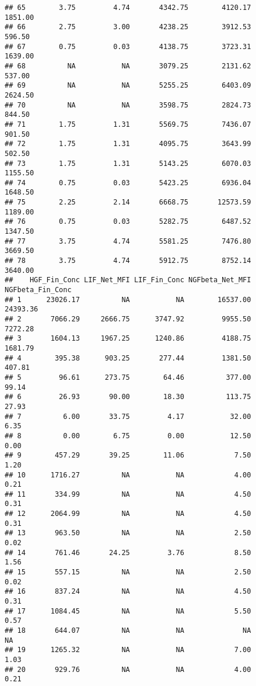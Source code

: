 \documentclass[]{article}
\begin{document}
\begin{verbatim}
## 65        3.75         4.74       4342.75        4120.17     1851.00
## 66        2.75         3.00       4238.25        3912.53      596.50
## 67        0.75         0.03       4138.75        3723.31     1639.00
## 68          NA           NA       3079.25        2131.62      537.00
## 69          NA           NA       5255.25        6403.09     2624.50
## 70          NA           NA       3598.75        2824.73      844.50
## 71        1.75         1.31       5569.75        7436.07      901.50
## 72        1.75         1.31       4095.75        3643.99      502.50
## 73        1.75         1.31       5143.25        6070.03     1155.50
## 74        0.75         0.03       5423.25        6936.04     1648.50
## 75        2.25         2.14       6668.75       12573.59     1189.00
## 76        0.75         0.03       5282.75        6487.52     1347.50
## 77        3.75         4.74       5581.25        7476.80     3669.50
## 78        3.75         4.74       5912.75        8752.14     3640.00
##    HGF_Fin_Conc LIF_Net_MFI LIF_Fin_Conc NGFbeta_Net_MFI NGFbeta_Fin_Conc
## 1      23026.17          NA           NA        16537.00         24393.36
## 2       7066.29     2666.75      3747.92         9955.50          7272.28
## 3       1604.13     1967.25      1240.86         4188.75          1681.79
## 4        395.38      903.25       277.44         1381.50           407.81
## 5         96.61      273.75        64.46          377.00            99.14
## 6         26.93       90.00        18.30          113.75            27.93
## 7          6.00       33.75         4.17           32.00             6.35
## 8          0.00        6.75         0.00           12.50             0.00
## 9        457.29       39.25        11.06            7.50             1.20
## 10      1716.27          NA           NA            4.00             0.21
## 11       334.99          NA           NA            4.50             0.31
## 12      2064.99          NA           NA            4.50             0.31
## 13       963.50          NA           NA            2.50             0.02
## 14       761.46       24.25         3.76            8.50             1.56
## 15       557.15          NA           NA            2.50             0.02
## 16       837.24          NA           NA            4.50             0.31
## 17      1084.45          NA           NA            5.50             0.57
## 18       644.07          NA           NA              NA               NA
## 19      1265.32          NA           NA            7.00             1.03
## 20       929.76          NA           NA            4.00             0.21

\end{verbatim}
\end{document}
